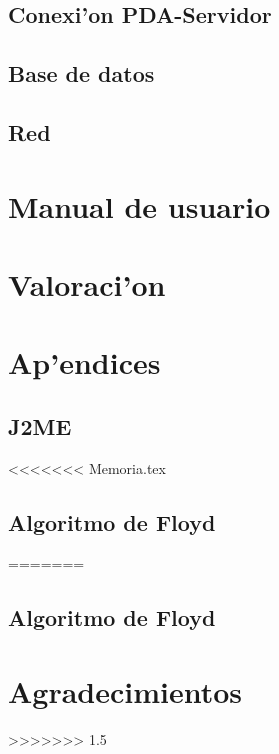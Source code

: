 \documentclass[a4paper,12pt]{article}
\begin{document}
	\subsection{Conexi'on PDA-Servidor}
		

	\subsection{Base de datos}
		

	\subsection{Red}
		


\pagebreak

\section{Manual de usuario}
		

\pagebreak

\section{Valoraci'on}

\pagebreak

\section{Ap'endices}

	\subsection{J2ME}
		

<<<<<<< Memoria.tex
	\subsection{Algoritmo de Floyd}
		
=======
	\index \subsection{Algoritmo de Floyd}
		

\pagebreak

\section{Agradecimientos}
	
>>>>>>> 1.5
\end{document}
